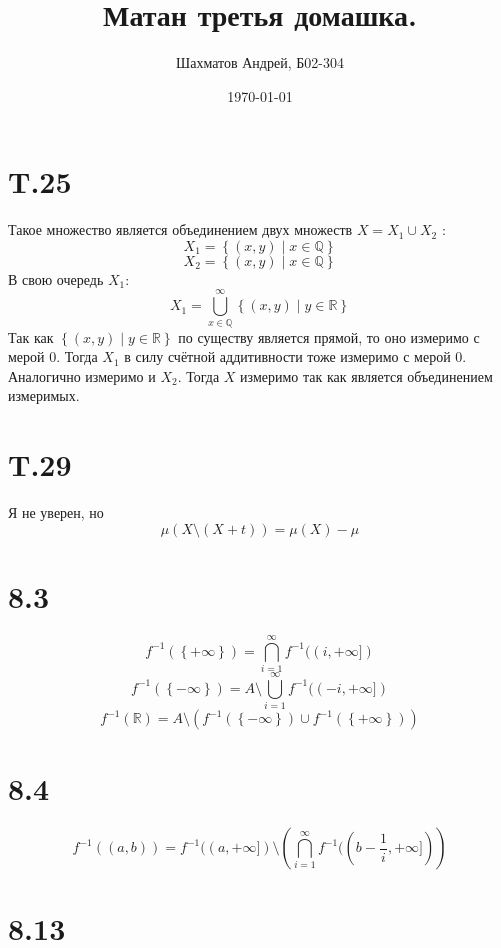 \documentclass[12pt]{article}
\title{Матан третья домашка.}
\author{Шахматов Андрей, Б02-304}
\date{\today}
\begin{document}
\maketitle
\tableofcontents

\section{T.25}
Такое множество является объединением двух множеств $X = X_1 \cup X_2$ : 
\[
    X_1 = \left\{ (x, y) \mid x \in \mathbb{Q} \right\} 
\]
\[
    X_2 = \left\{ (x, y) \mid x \in \mathbb{Q} \right\}
\]
В свою очередь $X_1$:
\[
    X_1 = \bigcup_{x \in \mathbb{Q}}^{\infty} \left\{ (x, y) \mid y \in \mathbb{R} \right\}   
\]  
Так как $\left\{ (x, y) \mid y \in \mathbb{R} \right\}$ по существу является прямой, то оно измеримо 
с мерой $0$. Тогда $X_1$ в силу счётной аддитивности тоже измеримо с мерой $0$. Аналогично измеримо 
и $X_2$. Тогда $X$ измеримо так как является объединением измеримых.   
\section{T.29}
Я не уверен, но
\[
    \mu(X \setminus (X + t)) = \mu(X) - \mu 
\]

\section{8.3}
\[
    f^{-1}(\left\{ +\infty \right\} ) = \bigcap_{i=1}^{\infty} f^{-1}((i, +\infty] ) 
\] 
\[
    f^{-1}(\left\{ -\infty \right\} ) = A \setminus \bigcup_{i=1}^{\infty} f^{-1}((-i, +\infty ] ) 
\] 
\[
    f^{-1}(\mathbb{R}) = A \setminus \left( f^{-1}(\left\{ -\infty \right\} ) \cup f^{-1}(\left\{ +\infty \right\} ) \right) 
\]
\section{8.4}
\[
    f^{-1}((a, b)) = f^{-1}((a, +\infty]) \setminus \left( \bigcap_{i=1}^{\infty} f^{-1}((b - \frac{1}{i}, +\infty])  \right)   
\]
\section{8.13}
\end{document}
